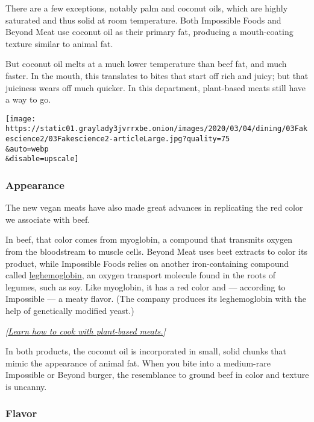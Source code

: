 There are a few exceptions, notably palm and coconut oils, which are
highly saturated and thus solid at room temperature. Both Impossible
Foods and Beyond Meat use coconut oil as their primary fat, producing a
mouth-coating texture similar to animal fat.

But coconut oil melts at a much lower temperature than beef fat, and
much faster. In the mouth, this translates to bites that start off rich
and juicy; but that juiciness wears off much quicker. In this
department, plant-based meats still have a way to go.

\texttt{[image: https://static01.graylady3jvrrxbe.onion/images/2020/03/04/dining/03Fakescience2/03Fakescience2-articleLarge.jpg?quality=75\\\&auto=webp\\\&disable=upscale]}

\hypertarget{appearance}{%
\subsubsection{Appearance}\label{appearance}}

The new vegan meats have also made great advances in replicating the red
color we associate with beef.

In beef, that color comes from myoglobin, a compound that transmits
oxygen from the bloodstream to muscle cells. Beyond Meat uses beet
extracts to color its product, while Impossible Foods relies on another
iron-containing compound called
\href{https://www.nytimes3xbfgragh.onion/2017/08/08/business/impossible-burger-food-meat.html}{leghemoglobin},
an oxygen transport molecule found in the roots of legumes, such as soy.
Like myoglobin, it has a red color and --- according to Impossible --- a
meaty flavor. (The company produces its leghemoglobin with the help of
genetically modified yeast.)

\emph{{[}}\href{https://www.nytimes3xbfgragh.onion/2020/03/03/dining/impossible-beyond-meat.html}{\emph{Learn
how to cook with plant-based meats.}}\emph{{]}}

In both products, the coconut oil is incorporated in small, solid chunks
that mimic the appearance of animal fat. When you bite into a
medium-rare Impossible or Beyond burger, the resemblance to ground beef
in color and texture is uncanny.

\hypertarget{flavor}{%
\subsubsection{Flavor}\label{flavor}}


